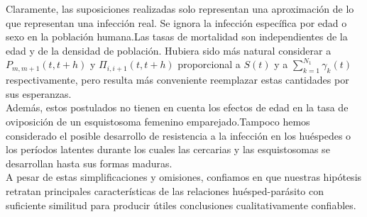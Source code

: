 \begin{Obs}
    Claramente, las suposiciones realizadas solo representan una aproximación de lo que representan una infección real. Se ignora la infección específica por edad o sexo en la población humana.Las tasas de mortalidad son independientes de la edad y de la densidad de población. Hubiera sido más natural considerar a $P_{m,m+1}(t,t+h)$ y $\Pi_{i,i+1}(t,t+h)$ proporcional a $S(t)$ y a $\sum_{k=1}^{N_1}\gamma_k(t)$ respectivamente, pero resulta más conveniente reemplazar estas cantidades por sus esperanzas.\\
    Además, estos postulados no tienen en cuenta los efectos de edad en la tasa de oviposición de un esquistosoma femenino emparejado.Tampoco hemos considerado el posible desarrollo de resistencia a la infección en los huéspedes o los períodos latentes durante los cuales las cercarias y las esquistosomas se desarrollan hasta sus formas maduras.\\A pesar de estas simplificaciones y omisiones, confiamos en que nuestras hipótesis retratan principales
    características de las relaciones huésped-parásito con suficiente similitud para producir útiles conclusiones cualitativamente confiables.
\end{Obs}
